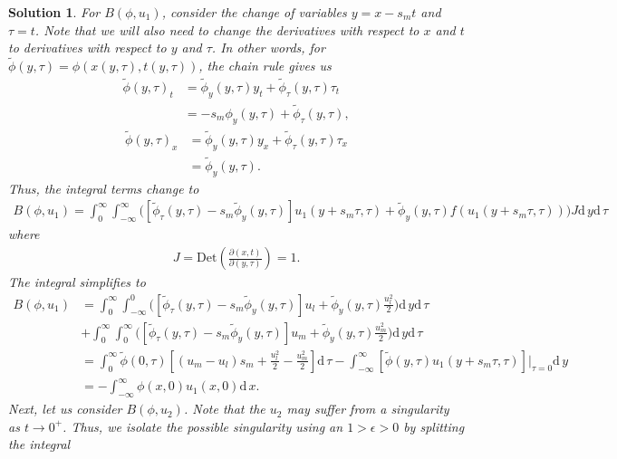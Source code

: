 \documentclass[10pt,letterpaper]{article}
\newcommand{\dif}[1][]{\mathrm{d} {#1}\,}
\newcommand{\frb}[1]{ \left(  {#1} \right) }
\theoremstyle{break}
\newtheorem{mysolution}{Solution}
\newenvironment{solution}{\begin{mysolution}}{\end{mysolution}}
\begin{document}
\begin{solution}
	For $B\frb{\phi,u_1}$, consider the change of variables $y = x - s_mt$ and $\tau = t$. Note that we will also need to change the derivatives with respect to $x$ and $t$ to derivatives with respect to $y$ and $\tau$. In other words, for $\widetilde \phi(y,\tau) = \phi(x(y,\tau),t(y,\tau))$, the chain rule gives us
	\begin{align*}
		\widetilde \phi(y,\tau)_t &=\widetilde \phi_y(y,\tau) y_t + \widetilde \phi_\tau(y,\tau) \tau_t\\
		&=
		-s_m \phi_y(y,\tau) + \widetilde \phi_\tau(y,\tau),
	\end{align*}
	\begin{align*}
		\widetilde \phi(y,\tau)_x &=\widetilde \phi_y(y,\tau) y_x + \widetilde \phi_\tau(y,\tau) \tau_x\\
		&= \widetilde \phi_y(y,\tau).
	\end{align*}
	Thus, the integral terms change to
	\begin{gather}
		B\frb{\phi,u_1}=\int_0^\infty \int_{-\infty}^\infty
				\Big( \left[ \widetilde \phi_\tau(y,\tau) -s_m \widetilde \phi_y(y,\tau)\right] u_1\frb{y+s_m \tau, \tau} + \widetilde \phi_y(y,\tau)  f(u_1\frb{y+s_m \tau, \tau}) \Big)
			J \dif y\dif \tau\ 
	\end{gather}
	where
	\begin{gather}
		J = \text{Det} \left( \frac{\partial(x,t)}{\partial(y,\tau)} \right) = 1.
	\end{gather}
	The integral simplifies to
	\begin{align} \label{Bsum1}
		B\frb{\phi,u_1}&=\int_0^\infty \int_{-\infty}^0
				\Big( \left[ \widetilde \phi_\tau(y,\tau) -s_m \widetilde \phi_y(y,\tau)\right] u_l + \widetilde \phi_y(y,\tau)  \frac{u_l^2}{2} \Big)
			 \dif y\dif \tau\  \\
			 & + \int_0^\infty \int_0^{\infty}
				\Big( \left[ \widetilde \phi_\tau(y,\tau) -s_m  \widetilde\phi_y(y,\tau)\right] u_m + \widetilde \phi_y(y,\tau)  \frac{u_m^2}{2} \Big)
			 \dif y\dif \tau\ \\
			 &= \int_0^\infty \widetilde \phi(0,\tau) \left[(u_m - u_l) s_m + \frac{u_l^2}{2} - \frac{u_m^2}{2} \right] \dif \tau - \int_{-\infty}^{\infty} \left[\widetilde \phi(y,\tau) u_1(y+s_m \tau,\tau) \right]\Big|_{\tau=0} \dif y\\
			 &= - \int_{-\infty}^{\infty} \phi(x,0) u_1(x,0) \dif x.
	\end{align}
	Next, let us consider $B\frb{\phi,u_2}$. Note that the $u_2$ may suffer from a singularity as $t \rightarrow 0^+$. Thus, we isolate the possible singularity using an $1>\epsilon > 0$ by splitting the integral

\end{solution}
\end{document}
